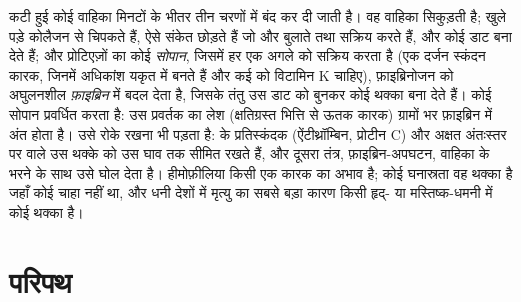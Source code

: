 \begin{proposition}[रक्तस्तंभन]\label{prop:b2:blood-circulation:clotting}
कटी हुई कोई वाहिका मिनटों के भीतर तीन चरणों में बंद कर दी जाती है। वह
वाहिका सिकुड़ती है;  खुले पड़े कोलैजन से चिपकते हैं, ऐसे
संकेत छोड़ते हैं जो और  बुलाते तथा सक्रिय करते हैं, और कोई डाट
बना देते हैं; और  प्रोटिएज़ों का कोई \emph{सोपान}, जिसमें हर एक
अगले को सक्रिय करता है (एक दर्जन स्कंदन कारक, जिनमें अधिकांश यकृत में
बनते हैं और कई को विटामिन K चाहिए), फ़ाइब्रिनोजन को अघुलनशील
\emph{फ़ाइब्रिन} में बदल देता है, जिसके तंतु उस डाट को बुनकर कोई थक्का
बना देते हैं। कोई सोपान प्रवर्धित करता है: उस प्रवर्तक का लेश
(क्षतिग्रस्त भित्ति से ऊतक कारक) ग्रामों भर फ़ाइब्रिन में अंत होता है।
उसे रोके रखना भी पड़ता है:  के प्रतिस्कंदक
(ऐंटीथ्रॉम्बिन, प्रोटीन C) और अक्षत अंतःस्तर पर वाले उस थक्के को उस घाव
तक सीमित रखते हैं, और दूसरा तंत्र, फ़ाइब्रिन-अपघटन, वाहिका के भरने के
साथ उसे घोल देता है। हीमोफ़ीलिया किसी एक कारक का अभाव है; कोई
घनास्रता वह थक्का है जहाँ कोई चाहा नहीं था, और धनी देशों में मृत्यु का
सबसे बड़ा कारण किसी हृद्- या मस्तिष्क-धमनी में कोई थक्का है।
\end{proposition}

\section{परिपथ}

